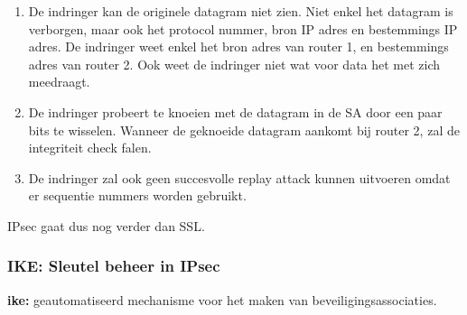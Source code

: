 \begin{enumerate}
    \item De indringer kan de originele datagram niet zien. Niet enkel het datagram is verborgen, maar ook het protocol nummer, bron IP adres en bestemmings IP adres. De indringer weet enkel het bron adres van router 1, en bestemmings adres van router 2. Ook weet de indringer niet wat voor data het met zich meedraagt.
\item De indringer probeert te knoeien met de datagram in de SA door een paar bits te wisselen. Wanneer de geknoeide datagram aankomt bij router 2, zal de integriteit check falen.
\item De indringer zal ook geen succesvolle replay attack kunnen uitvoeren omdat er sequentie nummers worden gebruikt.
\end{enumerate}

\noindent IPsec gaat dus nog verder dan SSL.

\newpage

\subsubsection{IKE: Sleutel beheer in IPsec}

\noindent \textbf{\acrfull{ike}:} geautomatiseerd mechanisme voor het maken van beveiligingsassociaties.

